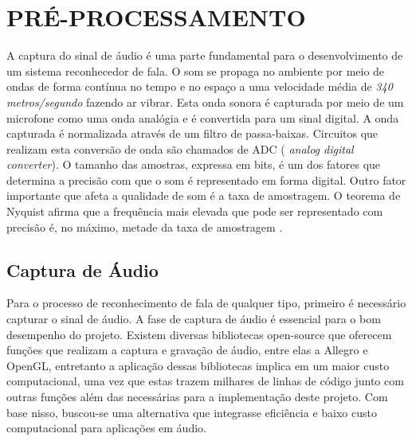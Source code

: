 \chapter{PRÉ-PROCESSAMENTO}
\thispagestyle{plain}
\quad A captura do sinal de áudio é uma parte fundamental para o desenvolvimento de um sistema reconhecedor de fala. O som se propaga no ambiente por meio de ondas de forma contínua no tempo e no espaço a uma velocidade média de \textit{340 metros/segundo} fazendo  ar vibrar. Esta onda sonora  é capturada por meio de um microfone como uma onda analógia e  é convertida para um sinal digital. A onda capturada é normalizada através de um filtro de passa-baixas. Circuitos que realizam esta conversão de onda são chamados de  ADC (\textit{ analog digital converter}). O tamanho das amostras, expressa em bits, é um dos fatores que determina a precisão com que o som é representado em forma digital. Outro fator importante que afeta a qualidade de som é a taxa de amostragem. O teorema de Nyquist  afirma que a frequência mais elevada que pode ser representado com precisão é, no máximo, metade da taxa de amostragem \cite{nyqui}.

\section{Captura de Áudio}
\quad Para o processo de reconhecimento de fala de qualquer tipo, primeiro é necessário capturar o sinal de áudio. A fase de captura de áudio é essencial para o bom desempenho do projeto. Existem diversas bibliotecas open-source que oferecem funções que realizam a captura e gravação de áudio, entre elas a Allegro e OpenGL, entretanto a aplicação dessas bibliotecas implica em um maior custo computacional, uma vez que estas trazem milhares de linhas de código junto com outras funções além das necessárias para a implementação deste projeto. Com base nisso, buscou-se uma alternativa que integrasse eficiência e baixo custo computacional para aplicações em áudio. 
 
